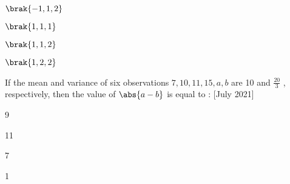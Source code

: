  \begin{enumerate}
     \begin{multicols}{2}
     \item $\brak{-1,1,2}$
     \item $\brak{1,1,1}$
     \item $\brak{1,1,2}$
     \item $\brak{1,2,2}$
     \end{multicols}
 \end{enumerate}
 \item If the mean and variance of six observations $7, 10, 11, 15, a, b $ are 10 and $\frac{20}{3}$
 , respectively, then the value of $\abs{a -
 b}$ is equal to : \hfill[July 2021]
 \begin{enumerate}
 \begin{multicols}{2}  
     \item 9
     \item 11
     \item 7
     \item 1
 \end{multicols}
 \end{enumerate}